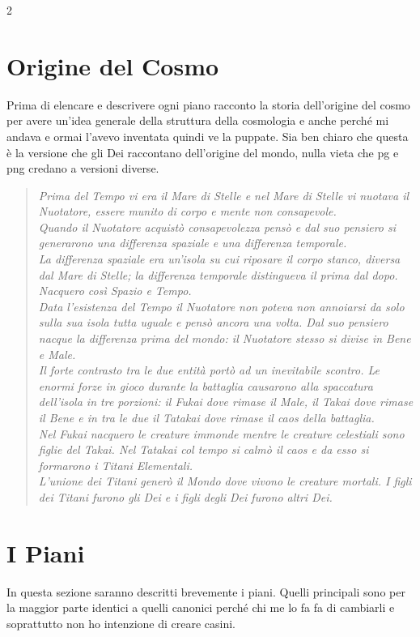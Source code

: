 \documentclass[10pt, a4paper]{report}
\begin{document}
\begin{multicols}{2}
\section{Origine del Cosmo}
Prima di elencare e descrivere ogni piano racconto la storia dell'origine del cosmo per avere un'idea generale della struttura della cosmologia e anche perché mi andava e ormai l'avevo inventata quindi ve la puppate. Sia ben chiaro che questa è la versione che gli Dei raccontano dell'origine del mondo, nulla vieta che pg e png credano a versioni diverse. 
\\
\begin{verse}
	\textit{Prima del Tempo vi era il Mare di Stelle e nel Mare di Stelle vi nuotava il Nuotatore, essere munito di corpo e mente non consapevole.\\
		Quando il Nuotatore acquistò consapevolezza pensò e dal suo pensiero si generarono una differenza spaziale e una differenza temporale. \\
		La differenza spaziale era un'isola su cui riposare il corpo stanco, diversa dal Mare di Stelle; la differenza temporale distingueva il prima dal dopo. Nacquero così Spazio e Tempo. \\
		Data l'esistenza del Tempo il Nuotatore non poteva non annoiarsi da solo sulla sua isola tutta uguale e pensò ancora una volta. Dal suo pensiero nacque la differenza prima del mondo: il Nuotatore stesso si divise in Bene e Male. \\
		Il forte contrasto tra le due entità portò ad un inevitabile scontro. Le enormi forze in gioco durante la battaglia causarono alla spaccatura dell'isola in tre porzioni: il Fukai dove rimase il Male, il Takai dove rimase il Bene e in tra le due il Tatakai dove rimase il caos della battaglia. \\
		Nel Fukai nacquero le creature immonde mentre le creature celestiali sono figlie del Takai.
		Nel Tatakai col tempo si calmò il caos e da esso si formarono i Titani Elementali.
		\\ L'unione dei Titani generò il Mondo dove vivono le creature mortali. I figli dei Titani furono gli Dei e i figli degli Dei furono altri Dei.}
\end{verse}
\vspace{0.5cm}
\section{I Piani}
In questa sezione saranno descritti brevemente i piani. Quelli principali sono per la maggior parte identici a quelli canonici perché chi me lo fa fa di cambiarli e soprattutto non ho intenzione di creare casini.

\end{multicols}
\end{document}
